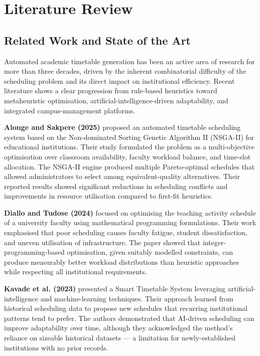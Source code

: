 \newpage
\chapter{Literature Review}

\section{Related Work and State of the Art}

Automated academic timetable generation has been an active area of research for more than three decades, driven by the inherent combinatorial difficulty of the scheduling problem and its direct impact on institutional efficiency. Recent literature shows a clear progression from rule-based heuristics toward metaheuristic optimisation, artificial-intelligence-driven adaptability, and integrated campus-management platforms.

\textbf{Alonge and Sakpere (2025)} proposed an automated timetable scheduling system based on the Non-dominated Sorting Genetic Algorithm II (NSGA-II) for educational institutions. Their study formulated the problem as a multi-objective optimisation over classroom availability, faculty workload balance, and time-slot allocation. The NSGA-II engine produced multiple Pareto-optimal schedules that allowed administrators to select among equivalent-quality alternatives. Their reported results showed significant reductions in scheduling conflicts and improvements in resource utilisation compared to first-fit heuristics.

\textbf{Diallo and Tudose (2024)} focused on optimising the teaching activity schedule of a university faculty using mathematical programming formulations. Their work emphasised that poor scheduling causes faculty fatigue, student dissatisfaction, and uneven utilisation of infrastructure. The paper showed that integer-programming-based optimisation, given suitably modelled constraints, can produce measurably better workload distributions than heuristic approaches while respecting all institutional requirements.

\textbf{Kavade et al. (2023)} presented a Smart Timetable System leveraging artificial-intelligence and machine-learning techniques. Their approach learned from historical scheduling data to propose new schedules that recurring institutional patterns tend to prefer. The authors demonstrated that AI-driven scheduling can improve adaptability over time, although they acknowledged the method's reliance on sizeable historical datasets --- a limitation for newly-established institutions with no prior records.

